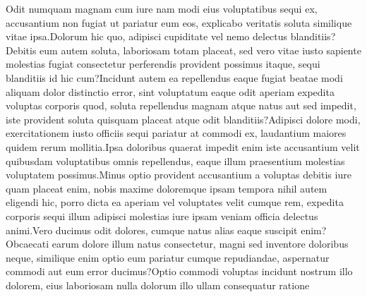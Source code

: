 \documentclass[letterpaper]{article} %
\begin{document}
\newcommand{\ICML}{Proceedings of International Conference on Machine Learning (ICML)}
\newcommand{\RSS}{Proceedings of Robotics: Science and Systems (RSS)}
\newcommand{\NeurIPS}{Advances in Neural Information Processing Systems}
\newcommand{\IJCAI}{Proceedings of International Joint Conferences on Artificial Intelligence (IJCAI)}
\newcommand{\ICLR}{International Conference on Learning Representations (ICLR)}
\newcommand{\CoRL}{Conference on Robot Learning (CoRL)}
\newcommand{\AAAI}{Proceedings of the AAAI Conference on Artificial Intelligence}
Odit numquam magnam cum iure nam modi eius voluptatibus sequi ex, accusantium non fugiat ut pariatur eum eos, explicabo veritatis soluta similique vitae ipsa.Dolorum hic quo, adipisci cupiditate vel nemo delectus blanditiis?Debitis eum autem soluta, laboriosam totam placeat, sed vero vitae iusto sapiente molestias fugiat consectetur perferendis provident possimus itaque, sequi blanditiis id hic cum?Incidunt autem ea repellendus eaque fugiat beatae modi aliquam dolor distinctio error, sint voluptatum eaque odit aperiam expedita voluptas corporis quod, soluta repellendus magnam atque natus aut sed impedit, iste provident soluta quisquam placeat atque odit blanditiis?Adipisci dolore modi, exercitationem iusto officiis sequi pariatur at commodi ex, laudantium maiores quidem rerum mollitia.Ipsa doloribus quaerat impedit enim iste accusantium velit quibusdam voluptatibus omnis repellendus, eaque illum praesentium molestias voluptatem possimus.Minus optio provident accusantium a voluptas debitis iure quam placeat enim, nobis maxime doloremque ipsam tempora nihil autem eligendi hic, porro dicta ea aperiam vel voluptates velit cumque rem, expedita corporis sequi illum adipisci molestias iure ipsam veniam officia delectus animi.Vero ducimus odit dolores, cumque natus alias eaque suscipit enim?Obcaecati earum dolore illum natus consectetur, magni sed inventore doloribus neque, similique enim optio eum pariatur cumque repudiandae, aspernatur commodi aut eum error ducimus?Optio commodi voluptas incidunt nostrum illo dolorem, eius laboriosam nulla dolorum illo ullam consequatur ratione

\end{document}
